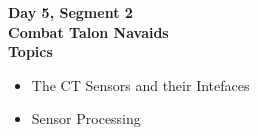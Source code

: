\begin{frame}
\textbf{Day 5, Segment 2\\
Combat Talon Navaids\\
Topics}
 \begin{itemize}
 \item The CT Sensors and their Intefaces
 \item Sensor Processing
\end{itemize}
\end{frame}


% 
